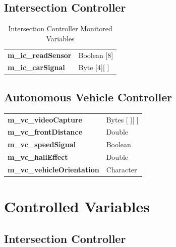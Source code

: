 \documentclass [10pt]{article}
\begin{document}
\subsection{Intersection Controller}

\begin{longtable}{ |p{ }  p{ }|}\caption{Intersection Controller Monitored Variables} \\   \hline
\textbf{m\_ic\_readSensor} & Boolean [8]  \\

\cellcolor{tableCell}\textbf{m\_ic\_carSignal}  & \cellcolor{tableCell} Byte [4][ ] \\  \hline
\end{longtable}

\subsection{Autonomous Vehicle Controller}

\begin{longtable}{ |p{ }  p{ }|}  \hline
\textbf{m\_vc\_videoCapture} & Bytes [ ][ ]  \\ 

\cellcolor{tableCell}\textbf{m\_vc\_frontDistance}  & \cellcolor{tableCell}Double \\ 


\textbf{m\_vc\_speedSignal} & Boolean \\

\cellcolor{tableCell}\textbf{m\_vc\_hallEffect}  & \cellcolor{tableCell}Double \\ 

\textbf{m\_vc\_vehicleOrientation} & Character \\\hline
\end{longtable}







\section{Controlled Variables}


\subsection{Intersection Controller}
\end{document}

